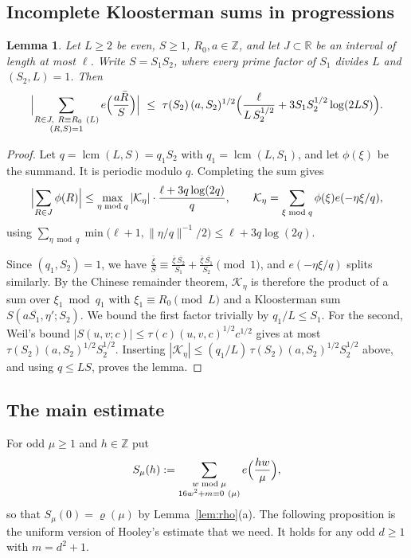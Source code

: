 \documentclass[11pt]{amsart}
\newtheorem{lemma}[theorem]{Lemma}
\theoremstyle{remark}
\theoremstyle{definition}
\numberwithin{equation}{section}
\newcommand{\Z}{\mathbb{Z}}
\newcommand{\R}{\mathbb{R}}
\newcommand{\lcm}{\operatorname{lcm}}
\begin{document}
\subsection{Incomplete Kloosterman sums in progressions}

\begin{lemma}\label{lem:kloost}
Let $L\ge2$ be even, $S\ge1$, $R_0,a\in\Z$, and let $J\subset\R$ be an interval of length at most $\ell$. Write $S=S_1S_2$, where every prime factor of $S_1$ divides $L$ and $(S_2,L)=1$. Then
\[
\Bigl|\sum_{\substack{R\in J,\ R\equiv R_0\ (L)\\ (R,S)=1}}e\Bigl(\frac{a\bar R}{S}\Bigr)\Bigr|\ \le\ \tau(S_2)\,(a,S_2)^{1/2}\Bigl(\frac{\ell}{L\,S_2^{1/2}}+3S_1S_2^{1/2}\log(2LS)\Bigr).
\]
\end{lemma}

\begin{proof}
Let $q=\lcm(L,S)=q_1S_2$ with $q_1=\lcm(L,S_1)$, and let $\phi(\xi)$ be the summand. It is periodic modulo $q$. Completing the sum gives
\[
\Bigl|\sum_{R\in J}\phi(R)\Bigr|\le\max_{\eta\bmod q}|\mathcal K_\eta|\cdot\frac{\ell+3q\log(2q)}{q},\qquad \mathcal K_\eta=\sum_{\xi\bmod q}\phi(\xi)e(-\eta\xi/q),
\]
using $\sum_{\eta\bmod q}\min\bigl(\ell+1,\|\eta/q\|^{-1}/2\bigr)\le\ell+3q\log(2q)$.

Since $(q_1,S_2)=1$, we have $\frac{\bar\xi}{S}\equiv\frac{\bar\xi\,\overline{S_2}}{S_1}+\frac{\bar\xi\,\overline{S_1}}{S_2}\pmod 1$, and $e(-\eta\xi/q)$ splits similarly. By the Chinese remainder theorem, $\mathcal K_\eta$ is therefore the product of a sum over $\xi_1\bmod q_1$ with $\xi_1\equiv R_0\pmod L$ and a Kloosterman sum $S(a\overline{S_1},\eta';S_2)$. We bound the first factor trivially by $q_1/L\le S_1$. For the second, Weil's bound $|S(u,v;c)|\le\tau(c)(u,v,c)^{1/2}c^{1/2}$ \cite[Cor.~11.12]{IK} gives at most $\tau(S_2)(a,S_2)^{1/2}S_2^{1/2}$. Inserting $|\mathcal K_\eta|\le (q_1/L)\,\tau(S_2)(a,S_2)^{1/2}S_2^{1/2}$ above, and using $q\le LS$, proves the lemma.
\end{proof}

\subsection{The main estimate}
For odd $\mu\ge1$ and $h\in\Z$ put
\[
S_\mu(h):=\sum_{\substack{w\bmod\mu\\ 16w^2+m\equiv0\ (\mu)}}e\Bigl(\frac{hw}{\mu}\Bigr),
\]
so that $S_\mu(0)=\varrho(\mu)$ by Lemma~\ref{lem:rho}(a). The following proposition is the uniform version of Hooley's estimate that we need. It holds for any odd $d\ge1$ with $m=d^2+1$.
\end{document}
